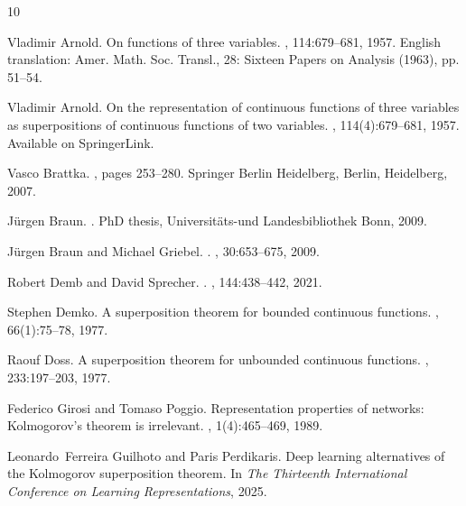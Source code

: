 \documentclass[10pt,reqno,final]{amsart}
\theoremstyle{remark}
\theoremstyle{definition}
\begin{document}
%
\begin{thebibliography}{10}

Vladimir Arnold.
\newblock On functions of three variables.
, 114:679--681,
  1957.
\newblock English translation: Amer. Math. Soc. Transl., 28: Sixteen Papers on
  Analysis (1963), pp. 51--54.

Vladimir Arnold.
\newblock On the representation of continuous functions of three variables as
  superpositions of continuous functions of two variables.
, 114(4):679--681, 1957.
\newblock Available on SpringerLink.

Vasco Brattka.
, pages 253--280.
\newblock Springer Berlin Heidelberg, Berlin, Heidelberg, 2007.

J{\"u}rgen Braun.
.
\newblock PhD thesis, Universit{\"a}ts-und Landesbibliothek Bonn, 2009.

J{\"u}rgen Braun and Michael Griebel.
.
, 30:653--675, 2009.

Robert Demb and David Sprecher.
.
, 144:438--442, 2021.

Stephen Demko.
\newblock A superposition theorem for bounded continuous functions.
, 66(1):75--78,
  1977.

Raouf Doss.
\newblock A superposition theorem for unbounded continuous functions.
,
  233:197--203, 1977.

Federico Girosi and Tomaso Poggio.
\newblock Representation properties of networks: Kolmogorov's theorem is
  irrelevant.
, 1(4):465--469, 1989.

Leonardo~Ferreira Guilhoto and Paris Perdikaris.
\newblock Deep learning alternatives of the {K}olmogorov superposition theorem.
\newblock In {\em The Thirteenth International Conference on Learning
  Representations}, 2025.


\end{thebibliography}
\end{document}
